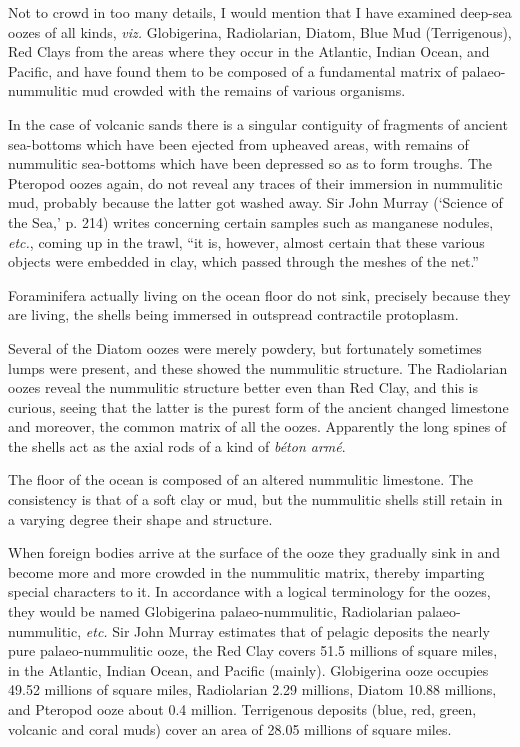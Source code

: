 \documentclass[a4paper, 12pt, oneside]{article}
\begin{document}
Not to crowd in too many details, I would mention that I have examined deep-sea oozes of all kinds, \emph{viz.} Globigerina, Radiolarian, Diatom, Blue Mud (Terrigenous), Red Clays from the areas where they occur in the Atlantic, Indian Ocean, and Pacific, and have found them to be composed of a fundamental matrix of palaeo-nummulitic mud crowded with the remains of various organisms.

In the case of volcanic sands there is a singular contiguity of fragments of ancient sea-bottoms which have been ejected from upheaved areas, with remains of nummulitic sea-bottoms which have been depressed so as to form troughs. The Pteropod oozes again, do not reveal any traces of their immersion in nummulitic mud, probably because the latter got washed away. Sir John Murray (`Science of the Sea,' p. 214) writes concerning certain samples such as manganese nodules, \emph{etc.}, coming up in the trawl, ``it is, however, almost certain that these various objects were embedded in clay, which passed through the meshes of the net.''

Foraminifera actually living on the ocean floor do not sink, precisely because they are living, the shells being immersed in outspread contractile protoplasm.

Several of the Diatom oozes were merely powdery, but fortunately sometimes lumps were present, and these showed the nummulitic structure. The Radiolarian oozes reveal the nummulitic structure better even than Red Clay, and this is curious, seeing that the latter is the purest form of the ancient changed limestone and moreover, the common matrix of all the oozes. Apparently the long spines of the shells act as the axial rods of a kind of \emph{béton armé}.

The floor of the ocean is composed of an altered nummulitic limestone. The consistency is that of a soft clay or mud, but the nummulitic shells still retain in a varying degree their shape and structure.

When foreign bodies arrive at the surface of the ooze they gradually sink in and become more and more crowded in the nummulitic matrix, thereby imparting special characters to it. In accordance with a logical terminology for the oozes, they would be named Globigerina palaeo-nummulitic, Radiolarian palaeo-nummulitic, \emph{etc.} Sir John Murray estimates that of pelagic deposits the nearly pure palaeo-nummulitic ooze, the Red Clay covers 51.5 millions of square miles, in the Atlantic, Indian Ocean, and Pacific (mainly). Globigerina ooze occupies 49.52 millions of square miles, Radiolarian 2.29 millions, Diatom 10.88 millions, and Pteropod ooze about 0.4 million. Terrigenous deposits (blue, red, green, volcanic and coral muds) cover an area of 28.05 millions of square miles.
\end{document}
